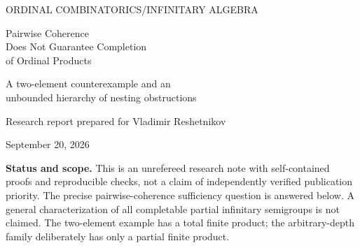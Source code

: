 \documentclass[11pt,letterpaper]{article}
\numberwithin{equation}{section}
\theoremstyle{definition}
\theoremstyle{remark}
\begin{document}
\hypersetup{pageanchor=false}
\begin{titlepage}
\setlength{\parindent}{0pt}
\vspace*{.45in}
{\small\sffamily\color{Olive}ORDINAL COMBINATORICS\enspace /\enspace INFINITARY ALGEBRA\par}
\vspace{.35in}
{\Huge\bfseries\raggedright Pairwise Coherence\\
Does Not Guarantee Completion\\
of Ordinal Products\par}
\vspace{.25in}
{\Large\raggedright A two-element counterexample and an\\
unbounded hierarchy of nesting obstructions\par}
\vspace{.35in}
{\large Research report prepared for Vladimir Reshetnikov\par}
{\normalsize September 20, 2026\par}
\vspace{.35in}
\begin{abstract}
Can a partially defined associative product of ordinal-indexed words be completed once every pair of defined two-stage regroupings agrees? We give a negative answer to the sufficiency question raised in Remark~7.1(b) of Lipparini's \emph{Noncommutative infinitary semigroups}. The counterexample has only two elements: retain all finite products in the cyclic group of order two, and prescribe every infinite constant product of its identity to be that identity. We prove the full pairwise coherence condition, for arbitrary index sets and even arbitrary partitions. Nevertheless, adjacent-pair and shifted-pair evaluations of an $\omega$-word prohibit any injective extension defining all finite and $\omega$-products.

The underlying inverse obstruction is already in Lipparini's Proposition~5.1; the point here is the coherent partial domain and its use to answer the stated sufficiency question. We also prove a completion criterion for the corresponding construction over every directly finite monoid, including all finite and all commutative monoids. Finally, for each finite depth $r\geq1$, a partial system on $3r+4$ elements has coherent evaluations through depth $r$ but conflicting evaluations at depth $r+1$. Every nonempty constant product in this second family is defined. Detailed proofs and exact computational certificates accompany the report.
\end{abstract}
\vfill
\begin{resultbox}
\small\textbf{Status and scope.} This is an unrefereed research note with self-contained proofs and reproducible checks, not a claim of independently verified publication priority. The precise pairwise-coherence sufficiency question is answered below. A general characterization of all completable partial infinitary semigroups is not claimed. The two-element example has a total finite product; the arbitrary-depth family deliberately has only a partial finite product.
\end{resultbox}
\end{titlepage}
\hypersetup{pageanchor=true}
\end{document}

